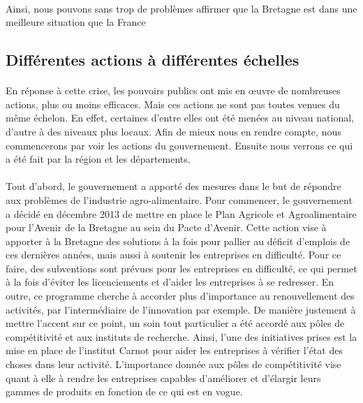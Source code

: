 \documentclass[a4paper,12pt]{report}
\begin{document}
			\paragraph{}Ainsi, nous pouvons sans trop de problèmes affirmer que la Bretagne est dans une meilleure situation que la France
			
		\subsection{Différentes actions à différentes échelles}
			\paragraph{}En réponse à cette crise, les pouvoirs publics ont mis en œuvre de nombreuses actions, plus ou moins efficaces. Mais ces actions ne sont pas toutes venues du même échelon. En effet, certaines d'entre elles ont été menées au niveau national, d'autre à des niveaux plus locaux. Afin de mieux nous en rendre compte, nous commencerons par voir les actions du gouvernement. Ensuite nous verrons ce qui a été fait par la région et les départements.

			\paragraph{}Tout d’abord, le gouvernement a apporté des mesures dans le but de répondre aux problèmes de l’industrie agro-alimentaire. Pour commencer, le gouvernement a décidé en décembre 2013 de mettre en place le Plan Agricole et Agroalimentaire pour l’Avenir de la Bretagne au sein du Pacte d’Avenir\cite{PacteAvenirBretagne}. Cette action vise à apporter à la Bretagne des solutions à la fois pour pallier au déficit d’emplois de ces dernières années, mais aussi à soutenir les entreprises en difficulté. Pour ce faire, des subventions sont prévues pour les entreprises en difficulté, ce qui permet à la fois d’éviter les licenciements et d’aider les entreprises à se redresser. En outre, ce programme cherche à accorder plus d’importance au renouvellement des activités, par l’intermédiaire de l’innovation par exemple. De manière justement à mettre l’accent sur ce point, un soin tout particulier a été accordé aux pôles de compétitivité et aux instituts de recherche. Ainsi, l'une des initiatives prises est la mise en place de l’institut Carnot pour aider les entreprises à vérifier l’état des choses dans leur activité. L’importance donnée aux pôles de compétitivité vise quant à elle à rendre les entreprises capables d’améliorer et d’élargir leurs gammes de produits en fonction de ce qui est en vogue.
\end{document}
